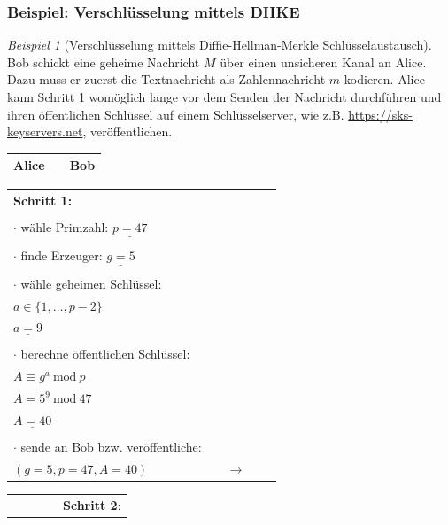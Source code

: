 \documentclass[
  a4paper,
  11pt,
]{scrartcl}
\theoremstyle{plain}
\theoremstyle{definition}
\theoremstyle{remark}
\newtheorem{beispiel}{Beispiel}
\newcommand{\Mod}[1]{\ \mathrm{mod}\ #1}
\begin{document}
\subsubsection{Beispiel: Verschlüsselung mittels DHKE}
\label{sub:enc_with_dhke_example}
\begin{beispiel}[Verschlüsselung mittels Diffie-Hellman-Merkle Schlüsselaustausch]
  Bob schickt eine geheime Nachricht $M$ über einen unsicheren Kanal an Alice.
  Dazu muss er zuerst die Textnachricht als Zahlennachricht $m$ kodieren.
  Alice kann Schritt 1 womöglich lange vor dem Senden der Nachricht durchführen
  und ihren öffentlichen Schlüssel auf einem Schlüsselserver, wie z.B.
  \url{https://sks-keyservers.net}, veröffentlichen.
  \begin{center}
    \begin{tabularx}{\textwidth}{lXr}
      \textbf{Alice} & & \textbf{Bob}\\
      \midrule
    \end{tabularx}
    \begin{tabularx}{\textwidth}{lXcXl}
      \textbf{Schritt 1:} & & & & \\
      & & & & \\
      $\cdot$ wähle Primzahl: $\underline{p = 47}$ & & & & \\
      & & & & \\
      $\cdot$ finde Erzeuger: $\underline{g = 5}$ & & & & \\
      & & & & \\
      $\cdot$ wähle geheimen Schlüssel: & & & & \\
      $a \in \{1, \dots, p-2\}$ & & & & \\
      $\underline{a = 9}$ & & & & \\
      & & & & \\
      $\cdot$ berechne öffentlichen Schlüssel: & & & & \\
      $A \equiv g^a \Mod{p}$ & & & & \\
      $A = 5^{9} \Mod{47}$ & & & & \\
      $\underline{A = 40}$ & & & & \\
      & & & & \\
      $\cdot$ sende an Bob bzw. veröffentliche: & & & & \\
      $(g = 5, p = 47, A = 40)$ & & $\to$ & &\\\midrule
    \end{tabularx}
    \begin{tabularx}{\textwidth}{lXcXl}
      & & & & \textbf{Schritt 2}:\\

\end{tabularx}
\end{center}
\end{beispiel}
\end{document}
